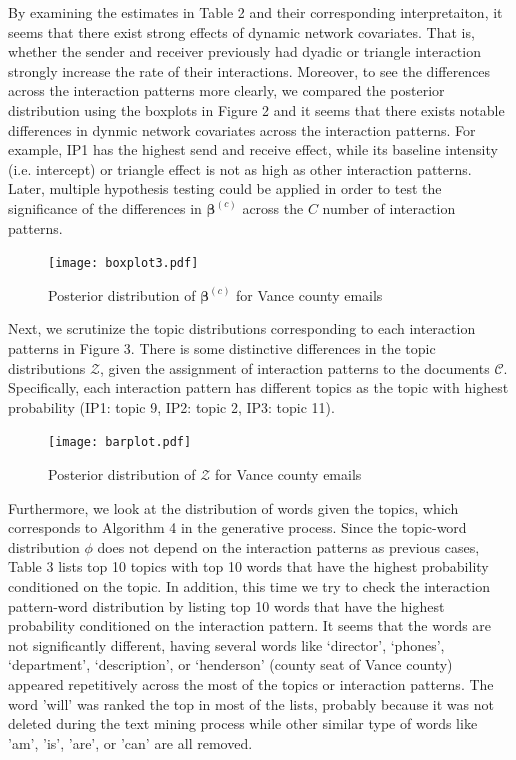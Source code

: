 \documentclass[a4paper]{article}
\begin{document}
By examining the estimates in Table 2 and their corresponding interpretaiton, it seems that there exist strong effects of dynamic network covariates. That is, whether the sender and receiver previously had dyadic or triangle interaction strongly increase the rate of their interactions. Moreover, to see the differences across the interaction patterns more clearly, we compared the posterior distribution using the boxplots in Figure 2 and it seems that there exists notable differences in dynmic network covariates across the interaction patterns. For example, IP1 has the highest send and receive effect, while its baseline intensity (i.e. intercept) or triangle effect is not as high as other interaction patterns. Later, multiple hypothesis testing could be applied in order to test the significance of the differences in  $\boldsymbol{\beta}^{(c)}$ across the $C$ number of interaction patterns.\\
\begin{figure}[ht]
	\centering
	\texttt{[image: boxplot3.pdf]} 
	\caption{Posterior distribution of  $\boldsymbol{\beta}^{(c)}$ for Vance county emails}
	\label{fig:Vanceboxplot}
\end{figure}
\newline Next, we scrutinize the topic distributions corresponding to each interaction patterns in Figure 3. There is some distinctive differences in the topic distributions $\mathcal{Z}$, given the assignment of interaction patterns to the documents $\mathcal{C}$. Specifically, each interaction pattern has different topics as the topic with highest probability (IP1: topic 9, IP2: topic 2, IP3: topic 11).
\footnotesize
\begin{figure}[ht]
	\centering
	\texttt{[image: barplot.pdf]} 
\caption{Posterior distribution of  $\mathcal{Z}$ for Vance county emails}
\label{fig:Vancebarplot}
\end{figure}
\normalsize
\newline
Furthermore, we look at the distribution of words given the topics, which corresponds to Algorithm 4 in the generative process. Since the topic-word distribution $\phi$ does not depend on the interaction patterns as previous cases, Table 3 lists top 10 topics with top 10 words that have the highest probability conditioned on the topic. In addition, this time we try to check the interaction pattern-word distribution by listing top 10 words that have the highest probability conditioned on the interaction pattern. It seems that the words are not significantly different, having several words like `director', `phones', `department', `description', or `henderson' (county seat of Vance county) appeared repetitively across the most of the topics or interaction patterns. The word 'will' was ranked the top in most of the lists, probably because it was not deleted during the text mining process while other similar type of words like 'am', 'is', 'are', or 'can' are all removed. \\
\end{document}
